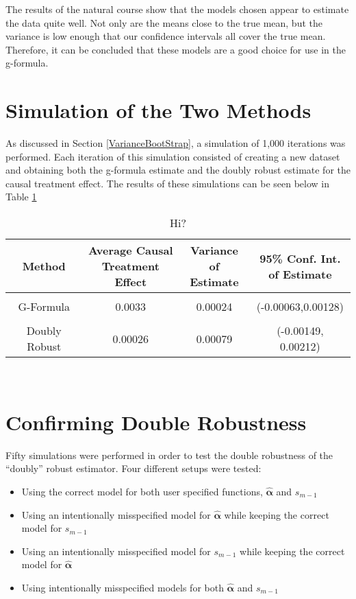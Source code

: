 The results of the natural course show that the models chosen appear to estimate the data quite well.  Not only are the means close to the true mean, but the variance is low enough that our confidence intervals all cover the true mean.  Therefore, it can be concluded that these models are a good choice for use in the g-formula.  

\section{Simulation of the Two Methods} 
As discussed in Section \ref{VarianceBootStrap}, a simulation of 1,000 iterations was performed.  Each iteration of this simulation consisted of creating a new dataset and obtaining both the g-formula estimate and the doubly robust estimate for the causal treatment effect.  The results of these simulations can be seen below in Table \ref{simdata} 

\begin{table}[h!]
\centering
\begin{tabular}{c | c c c }
Method & \shortstack{Average Causal \\ Treatment Effect} & \shortstack{Variance\\ of Estimate} & \shortstack{95\% Conf. Int.\\ of Estimate} \\ 
\hline \\
G-Formula & 0.0033 & 0.00024&(-0.00063,0.00128)\\ \\ 
Doubly Robust & 0.00026 &0.00079 & (-0.00149, 0.00212)
\end{tabular} \\
\centering
\caption{Hi? \label{simdata}}
\end{table}


\section{Confirming Double Robustness} 
Fifty simulations were performed in order to test the double robustness of the ``doubly'' robust estimator.  Four different setups were tested: 
\begin{itemize} 
\item Using the correct model for both user specified functions, $\hat{\mathbf{\alpha}}$ and $s_{m-1}$ 
\item Using an intentionally misspecified model for $\hat{\mathbf{\alpha}}$ while keeping the correct model for $s_{m-1}$ 
\item Using an intentionally misspecified model for $s_{m-1}$ while keeping the correct model for $\hat{\mathbf{\alpha}}$
\item Using intentionally misspecified models for both $\hat{\mathbf{\alpha}}$ and $s_{m-1}$ 
\end{itemize} 

